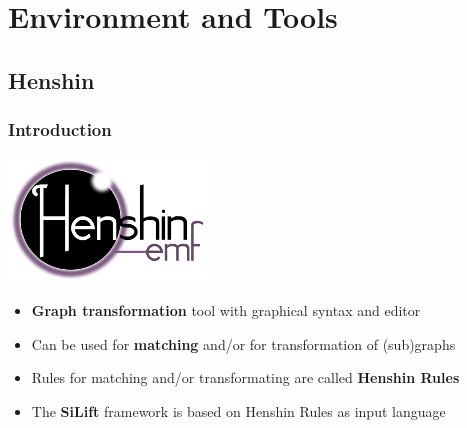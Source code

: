 \documentclass[10pt]{beamer}
\begin{document}
\section{Environment and Tools}
\subsection{Henshin}
\begin{frame}
\frametitle{Introduction}
\begin{center}
\includegraphics[scale=1.5]{henshinLogo}\\
\end{center}
\begin{itemize}
  \item \textbf{Graph transformation} tool with graphical syntax and editor
  \item Can be used for \textbf{matching} and/or for transformation of (sub)graphs 
  \item Rules for matching and/or transformating are called \textbf{Henshin  Rules}
  \item The \textbf{SiLift} framework is based on Henshin Rules as input \glqq
  language\grqq\
\end{itemize}
\end{frame}
\end{document}
